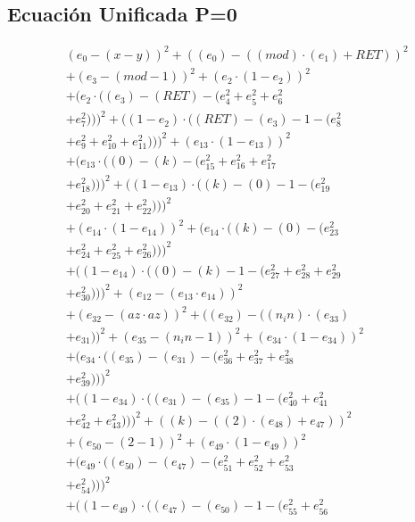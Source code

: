 \documentclass[10pt, a4paper]{article}
\begin{document}
\subsection*{Ecuación Unificada P=0}
\begin{align*}
& (e_{0} - (x - y))^{2} + ((e_{0}) - ((mod)  \cdot  (e_{1}) + RET))^{2} \\
& + (e_{3} - (mod - 1))^{2} + (e_{2}  \cdot  (1 - e_{2}))^{2} \\
& + (e_{2}  \cdot  ((e_{3}) - (RET) - (e_{4}^{2} + e_{5}^{2} + e_{6}^{2} \\
& + e_{7}^{2})))^{2} + ((1 - e_{2})  \cdot  ((RET) - (e_{3}) - 1 - (e_{8}^{2} \\
& + e_{9}^{2} + e_{10}^{2} + e_{11}^{2})))^{2} + (e_{13}  \cdot  (1 - e_{13}))^{2} \\
& + (e_{13}  \cdot  ((0) - (k) - (e_{15}^{2} + e_{16}^{2} + e_{17}^{2} \\
& + e_{18}^{2})))^{2} + ((1 - e_{13})  \cdot  ((k) - (0) - 1 - (e_{19}^{2} \\
& + e_{20}^{2} + e_{21}^{2} + e_{22}^{2})))^{2} \\
& + (e_{14}  \cdot  (1 - e_{14}))^{2} + (e_{14}  \cdot  ((k) - (0) - (e_{23}^{2} \\
& + e_{24}^{2} + e_{25}^{2} + e_{26}^{2})))^{2} \\
& + ((1 - e_{14})  \cdot  ((0) - (k) - 1 - (e_{27}^{2} + e_{28}^{2} + e_{29}^{2} \\
& + e_{30}^{2})))^{2} + (e_{12} - (e_{13}  \cdot  e_{14}))^{2} \\
& + (e_{32} - (az  \cdot  az))^{2} + ((e_{32}) - ((n_in)  \cdot  (e_{33}) \\
& + e_{31}))^{2} + (e_{35} - (n_in - 1))^{2} + (e_{34}  \cdot  (1 - e_{34}))^{2} \\
& + (e_{34}  \cdot  ((e_{35}) - (e_{31}) - (e_{36}^{2} + e_{37}^{2} + e_{38}^{2} \\
& + e_{39}^{2})))^{2} \\
& + ((1 - e_{34})  \cdot  ((e_{31}) - (e_{35}) - 1 - (e_{40}^{2} + e_{41}^{2} \\
& + e_{42}^{2} + e_{43}^{2})))^{2} + ((k) - ((2)  \cdot  (e_{48}) + e_{47}))^{2} \\
& + (e_{50} - (2 - 1))^{2} + (e_{49}  \cdot  (1 - e_{49}))^{2} \\
& + (e_{49}  \cdot  ((e_{50}) - (e_{47}) - (e_{51}^{2} + e_{52}^{2} + e_{53}^{2} \\
& + e_{54}^{2})))^{2} \\
& + ((1 - e_{49})  \cdot  ((e_{47}) - (e_{50}) - 1 - (e_{55}^{2} + e_{56}^{2} \\

\end{align*}
\end{document}
